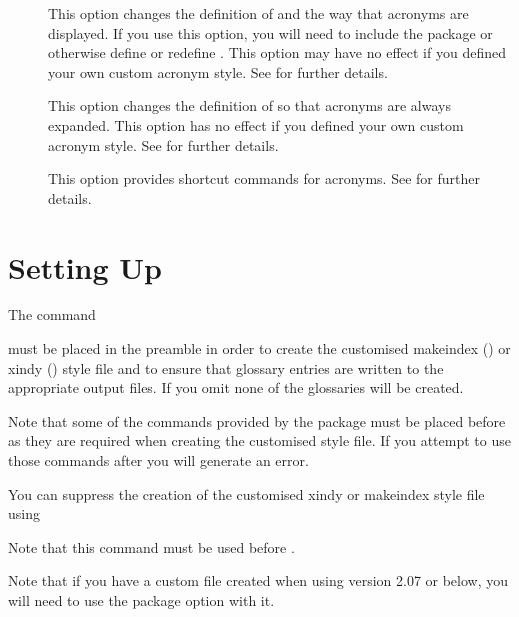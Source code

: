 \documentclass{nlctdoc}
\begin{document}
\begin{description}
\item[] This option changes the definition of
 and the way that acronyms are displayed. If you use
this option, you will need to include the  package or
otherwise define  or redefine .
This option may have no effect if you defined your own custom acronym
style. See  for further details.

\item[] This option changes the definition of
 so that acronyms are always expanded. This
option has no effect if you defined your own custom acronym style. 
See  for further details.

\item[] This option provides shortcut commands
for acronyms.  See  for further details.

\end{description}

\section{Setting Up}
\label{sec:setup}

The command
\begin{definition}[\DescribeMacro{\makeglossaries}]
\end{definition}
must be placed in the preamble in order to create the customised
\gls{makeindex} () or \gls{xindy} ()
style file and to ensure that glossary entries are written to the
appropriate output files. If you omit  none of
the glossaries will be created.

\begin{important}
Note that some of the commands provided by the 
package must be placed before  as they are
required when creating the customised style file. If you attempt
to use those commands after  you will generate
an error.
\end{important}

You can suppress the creation of the customised \gls{xindy}
or \gls{makeindex} style file using
\begin{definition}[\DescribeMacro{\noist}]
\end{definition}
Note that this command must be used before .
\begin{important}
Note that if you have a custom  file created when using 
 version 2.07 or below, you will need to use the
 package option with it.
\end{important}
\end{document}
